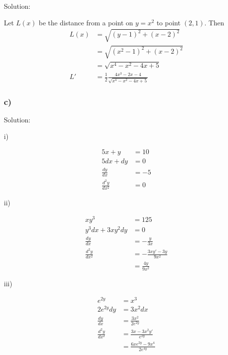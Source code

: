 \documentclass[letterpaper, 11pt]{article}
\newcommand{\1}{\mathds{1}}	%
\theoremstyle{definition}
\begin{document}
  Solution:

  Let $L(x)$ be the distance from a point on $y=x ^{2}$ to point $(2,1)$. Then
  \begin{align*}
    L(x) & = \sqrt{(y - 1) ^{2} + (x-2) ^{2}}                                 \\
         & = \sqrt{(x ^{2} - 1) ^{2} + (x-2) ^{2}}                            \\
         & = \sqrt{x ^{4} - x ^{2} -4x + 5}                                   \\
    L'   & = \frac{1}{2}\frac{4x ^{3} -2x -4}{\sqrt{x ^{4} - x ^{2} -4x + 5}}
  \end{align*}

  \subsubsection*{c)}

  Solution:

  i)

  \begin{align*}
    5x + y                  & = 10 \\
    5dx + dy                & = 0  \\
    \frac{dy}{dx}           & = -5 \\
    \frac{d ^{2}y}{dx ^{2}} & = 0
  \end{align*}

  ii)

  \begin{align*}
    xy ^{3}                 & = 125                         \\
    y ^{3} dx + 3xy ^{2}dy  & = 0                           \\
    \frac{dy}{dx}           & = -\frac{y}{3x}               \\
    \frac{d ^{2}y}{dx ^{2}} & = - \frac{3xy' - 3y}{9x ^{2}} \\
                            & = \frac{4y}{9x ^{2}}
  \end{align*}


  iii)

  \begin{align*}
    e ^{2y}                 & = x ^{3}                               \\
    2e ^{2y} dy             & = 3x ^{2} dx                           \\
    \frac{dy}{dx}           & = \frac{3x ^{2}}{2e ^{2y}}             \\
    \frac{d ^{2}y}{dx ^{2}} & = \frac{3x - 3x ^{2}y'}{e ^{2y}}       \\
                            & = \frac{6xe ^{2y} - 9x ^{4}}{2e ^{4y}} \\
  \end{align*}
\end{document}
